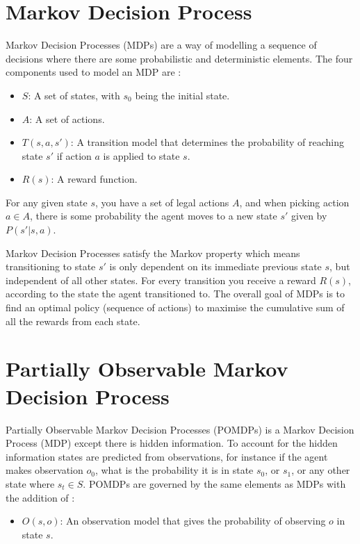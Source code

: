 \documentclass{bhamthesis}
\theoremstyle{definition}
\begin{document}
\section{Markov Decision Process}\label{s:mdp}
Markov Decision Processes (MDPs) are a way of modelling a sequence of decisions where there are some probabilistic and deterministic elements. The four components used to model an MDP are \cite{Russell2016}:

\begin{itemize}
	\item $S$: A set of states, with $s_0$ being the initial state.
	\item $A$: A set of actions.
	\item $T(s,a,s')$: A transition model that determines the probability of reaching state $s'$ if action $a$ is applied to state $s$.
	\item $R(s)$: A reward function.
\end{itemize}
For any given state $s$, you have a set of legal actions $A$, and when picking action $a \in A$, there is some probability the agent moves to a new state $s'$ given by $P(s'| s,a)$.

Markov Decision Processes satisfy the Markov property which means transitioning to state $s'$ is only dependent on its immediate previous state $s$, but independent of all other states. For every transition you receive a reward $R(s)$, according to the state the agent transitioned to. The overall goal of MDPs is to find an optimal policy (sequence of actions) to maximise the cumulative sum of all the rewards from each state.


\section{Partially Observable Markov Decision Process}\label{s:pomdb}
Partially Observable Markov Decision Processes (POMDPs) is a Markov Decision Process (MDP) except there is hidden information. To account for the hidden information states are predicted from observations, for instance if the agent makes observation $o_0$, what is the probability it is in state $s_0$, or $s_1$, or any other state where $s_t \in S$. POMDPs are governed by the same elements as MDPs with the addition of \cite{Browne2012}:

\begin{itemize}
	\item $O(s,o)$: An observation model that gives the probability of observing $o$ in state $s$.
\end{itemize}
\end{document}
